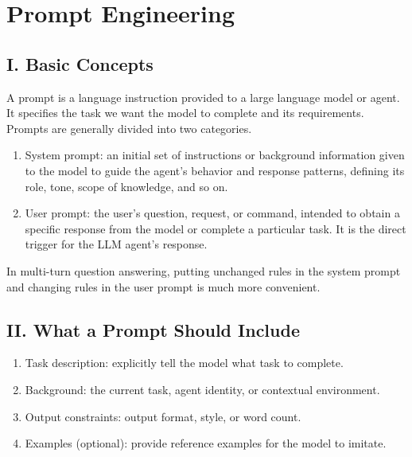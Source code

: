 \setcounter{section}{1}

\hypertarget{prompt-engineering}{%
\section{Prompt Engineering}\label{prompt-engineering}}

\hypertarget{i.-basic-concepts}{%
\subsection{I. Basic Concepts}\label{i.-basic-concepts}}

A prompt is a language instruction provided to a large language model or agent. It specifies the task we want the model to complete and its requirements. Prompts are generally divided into two categories.

\begin{enumerate}
\def\labelenumi{\arabic{enumi}.}
\item
  System prompt: an initial set of instructions or background information given to the model to guide the agent's behavior and response patterns, defining its role, tone, scope of knowledge, and so on.
\item
  User prompt: the user's question, request, or command, intended to obtain a specific response from the model or complete a particular task. It is the direct trigger for the LLM agent's response.
\end{enumerate}

In multi-turn question answering, putting unchanged rules in the system prompt and changing rules in the user prompt is much more convenient.

\hypertarget{ii.-what-a-prompt-should-include}{%
\subsection{II. What a Prompt Should Include}\label{ii.-what-a-prompt-should-include}}

\begin{enumerate}
\def\labelenumi{\arabic{enumi}.}
\item
  Task description: explicitly tell the model what task to complete.
\item
  Background: the current task, agent identity, or contextual environment.
\item
  Output constraints: output format, style, or word count.
\item
  Examples (optional): provide reference examples for the model to imitate.
\end{enumerate}

